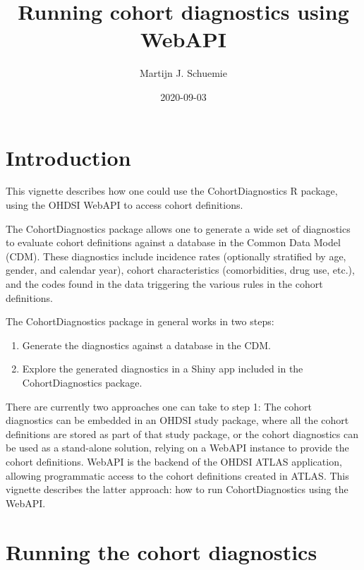 \documentclass[
]{article}
\title{Running cohort diagnostics using WebAPI}
\author{Martijn J. Schuemie}
\date{2020-09-03}
\providecommand{\tightlist}{%
  \setlength{\itemsep}{0pt}\setlength{\parskip}{0pt}}
\begin{document}
\maketitle

{
\setcounter{tocdepth}{2}
\tableofcontents
}
\hypertarget{introduction}{%
\section{Introduction}\label{introduction}}

This vignette describes how one could use the CohortDiagnostics R
package, using the OHDSI WebAPI to access cohort definitions.

The CohortDiagnostics package allows one to generate a wide set of
diagnostics to evaluate cohort definitions against a database in the
Common Data Model (CDM). These diagnostics include incidence rates
(optionally stratified by age, gender, and calendar year), cohort
characteristics (comorbidities, drug use, etc.), and the codes found in
the data triggering the various rules in the cohort definitions.

The CohortDiagnostics package in general works in two steps:

\begin{enumerate}
\def\labelenumi{\arabic{enumi}.}
\tightlist
\item
  Generate the diagnostics against a database in the CDM.
\item
  Explore the generated diagnostics in a Shiny app included in the
  CohortDiagnostics package.
\end{enumerate}

There are currently two approaches one can take to step 1: The cohort
diagnostics can be embedded in an OHDSI study package, where all the
cohort definitions are stored as part of that study package, or the
cohort diagnostics can be used as a stand-alone solution, relying on a
WebAPI instance to provide the cohort definitions. WebAPI is the backend
of the OHDSI ATLAS application, allowing programmatic access to the
cohort definitions created in ATLAS. This vignette describes the latter
approach: how to run CohortDiagnostics using the WebAPI.

\hypertarget{running-the-cohort-diagnostics}{%
\section{Running the cohort
diagnostics}\label{running-the-cohort-diagnostics}}
\end{document}
